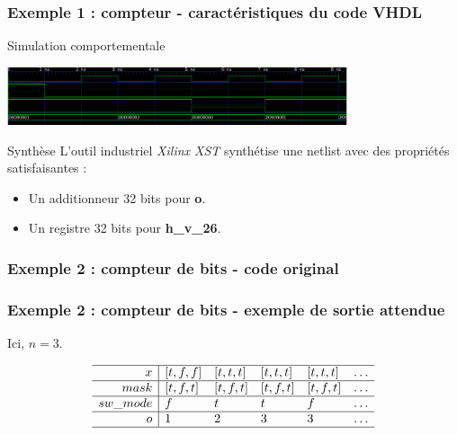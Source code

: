 \documentclass{beamer}
\begin{document}
\begin{frame}
  \frametitle{Exemple 1 : compteur - caractéristiques du code VHDL}

  \begin{block}{Simulation comportementale}
    \vspace{0.3cm}
    \begin{center}
      \includegraphics[width=10cm]{capture-chrono-compteur}
    \end{center}
  \end{block}

  \begin{block}{Synthèse}
    L'outil industriel \textit{Xilinx XST} synthétise une netlist avec des
    propriétés satisfaisantes :

    \begin{itemize}
    \item Un additionneur 32 bits pour \textbf{o}.
    \item Un registre 32 bits pour \textbf{h\_v\_26}.
    \end{itemize}
  \end{block}
\end{frame}


\begin{frame}
  \frametitle{Exemple 2 : compteur de bits - code original}

  \footnotesize

  
\end{frame}

\begin{frame}
  \frametitle{Exemple 2 : compteur de bits - exemple de sortie attendue}

  Ici, $n = 3$.

  \[
  \begin{array}{r|llllllllllllllllllllllllllll}
    \hline
    x & [t,f,f] & [t,t,t] & [t,t,t] & [t,t,t] & \dots \\
    \hline
    mask & [t,f,t] & [t,f,t] & [t,f,t] & [t,f,t] & \dots \\
    \hline
    sw\_mode & f & t & t & f & \dots \\
    \hline
    o & 1 & 2 & 3 & 3 & \dots \\
    \hline
  \end{array}
  \]
\end{frame}
\end{document}
